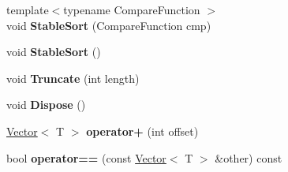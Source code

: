 \begin{DoxyCompactItemize}
\item 
{\footnotesize template$<$typename Compare\+Function $>$ }\\void {\bfseries Stable\+Sort} (Compare\+Function cmp)\hypertarget{classv8_1_1internal_1_1_vector_aa1179492b191705790d1db684c05430f}{}\label{classv8_1_1internal_1_1_vector_aa1179492b191705790d1db684c05430f}

\item 
void {\bfseries Stable\+Sort} ()\hypertarget{classv8_1_1internal_1_1_vector_a5fc19021882c987a5105126b094f28a4}{}\label{classv8_1_1internal_1_1_vector_a5fc19021882c987a5105126b094f28a4}

\item 
void {\bfseries Truncate} (int length)\hypertarget{classv8_1_1internal_1_1_vector_abe3333b756820ec1f98474bed844f096}{}\label{classv8_1_1internal_1_1_vector_abe3333b756820ec1f98474bed844f096}

\item 
void {\bfseries Dispose} ()\hypertarget{classv8_1_1internal_1_1_vector_a29bc665bb5c8a27e328107fcd414eef2}{}\label{classv8_1_1internal_1_1_vector_a29bc665bb5c8a27e328107fcd414eef2}

\item 
\hyperlink{classv8_1_1internal_1_1_vector}{Vector}$<$ T $>$ {\bfseries operator+} (int offset)\hypertarget{classv8_1_1internal_1_1_vector_a3e1a53b737875e85f8c0d0745be3ce31}{}\label{classv8_1_1internal_1_1_vector_a3e1a53b737875e85f8c0d0745be3ce31}

\item 
bool {\bfseries operator==} (const \hyperlink{classv8_1_1internal_1_1_vector}{Vector}$<$ T $>$ \&other) const \hypertarget{classv8_1_1internal_1_1_vector_a37fa50b75d0affc934489e33b37d9ede}{}\label{classv8_1_1internal_1_1_vector_a37fa50b75d0affc934489e33b37d9ede}

\end{DoxyCompactItemize}
